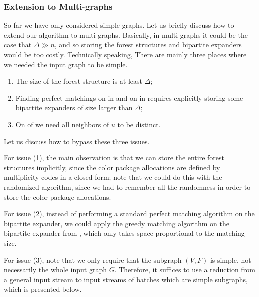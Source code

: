 \documentclass[11pt,a4paper]{article}
\begin{document}
\subsubsection{Extension to Multi-graphs}
So far we have only considered simple graphs. Let us briefly discuss how to extend our algorithm to multi-graphs. Basically, in multi-graphs it could be the case that $\Delta \gg n$, and so storing the forest structures and bipartite expanders would be too costly. Technically speaking, There are mainly three places where we needed the input graph to be simple.
\begin{enumerate}[(1)]
    \item The size of the forest structure is at least $\Delta$; 
    \item Finding perfect matchings on  in  and on  in  requires explicitly storing some bipartite expanders of size larger than $\Delta$; 
    \item On  of  we need all neighbors of $u$ to be distinct. 
\end{enumerate}
Let us discuss how to bypass these three issues.

For issue (1), the main observation is that we can store the entire forest structures implicitly, since the color package allocations are defined by multiplicity codes in a closed-form; note that we could do this with the randomized algorithm, since we had to remember all the randomness in order to store the color package allocations.

For issue (2), instead of performing a standard perfect matching algorithm on the bipartite expander, we could apply the greedy matching algorithm on the bipartite expander from , which only takes space proportional to the matching size.

For issue (3), note that we only require that the subgraph $(V, F)$ is simple, not necessarily the whole input graph $G$. Therefore, it suffices to use a reduction from a general input stream to input streams of batches which are simple subgraphs, which is presented below.
\end{document}
